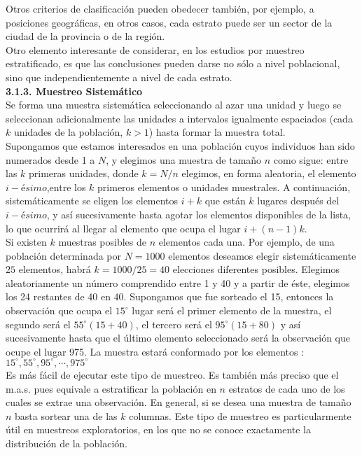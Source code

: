 \documentclass[base=hide,11pt]{elegantbook}
\begin{document}
{Otros criterios de clasificación pueden obedecer también, por ejemplo, a posiciones geográficas, en otros casos, cada estrato puede ser un sector de la ciudad de la provincia o de la región.\\
			
Otro elemento interesante de considerar, en los estudios por muestreo estratificado, es que las conclusiones  pueden darse no sólo a nivel poblacional, sino que independientemente a nivel de cada estrato.\\
			
\textcolor{col4}{\bf \large 3.1.3. Muestreo Sistemático}\\ 

Se forma una muestra sistemática seleccionando al azar una unidad y luego se seleccionan adicionalmente las unidades a intervalos igualmente espaciados (cada $k$ unidades de la población, $k>1$) hasta formar la muestra total.\\
			
Supongamos que estamos interesados en una población cuyos individuos  han sido numerados desde 1 a $N$, y elegimos una muestra de tamaño $n$ como sigue: entre las $k$ primeras unidades, donde $k =N/n$ elegimos, en forma aleatoria, el elemento $i-ésimo$,entre los $k$ primeros elementos o unidades muestrales. A continuación, sistemáticamente se eligen los elementos $i+k$ que están $k$ lugares después  del $i-ésimo$, y así  sucesivamente hasta agotar los elementos disponibles de la lista, lo que ocurrirá al llegar al elemento que ocupa el lugar $i+(n-1)k$. \\
			
Si existen $k$ muestras posibles de $n$ elementos cada una. Por ejemplo, de una población determinada por $N = 1000$ elementos deseamos elegir  sistemáticamente $25$ elementos, habrá $k = 1000/25 = 40$ elecciones diferentes posibles. Elegimos aleatoriamente un número comprendido entre 1 y 40 y a partir de éste, elegimos los 24 restantes de 40 en 40. Supongamos que fue sorteado el 15, entonces la observación que ocupa el $15^{\circ}$ lugar será el primer elemento de la muestra, el segundo será el $55^{\circ}(15+40)$, el tercero será el $95^{\circ}(15+80)$ y así  sucesivamente hasta que el último elemento seleccionado será la observación que ocupe el lugar 975. La muestra estará conformado por los elementos : $15^{\circ},55^{\circ}, 95^{\circ},\cdots,975^{\circ}$ \\
			
Es más fácil de ejecutar este tipo de muestreo. Es también más preciso que el m.a.s. pues equivale a estratificar la población en $n$ estratos de cada uno de los cuales se extrae una observación. En general, si se desea una muestra de tamaño $n$ basta sortear una de las $k$ columnas. Este tipo de muestreo es particularmente útil en muestreos exploratorios, en los que no se conoce exactamente la distribución de la población.\\
			
}
\end{document}

